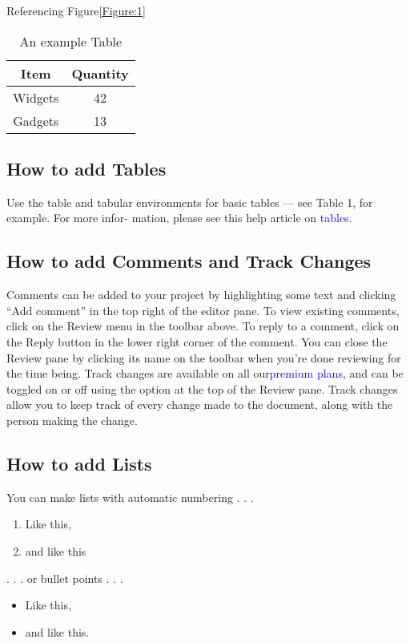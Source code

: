 \documentclass{article}
\begin{document}
Referencing Figure\ref{Figure:1}

\begin{table}[h]
	\centering
	\begin{tabular}{|c|c|}
		\hline
		\textbf{Item} & \textbf{Quantity}\\
		\hline
		Widgets & 42\\
		\hline
		Gadgets & 13\\
	\end{tabular}
\caption{An example Table}
\label{tab:example}
\end{table}



\subsection{How to add Tables}
Use the table and tabular environments for basic tables — see Table 1, for example. For more infor-
mation, please see this help article on \textcolor{blue}{tables}.

\subsection{How to add Comments and Track Changes}
Comments can be added to your project by highlighting some text and clicking “Add comment” in
the top right of the editor pane. To view existing comments, click on the Review menu in the toolbar
above. To reply to a comment, click on the Reply button in the lower right corner of the comment.
You can close the Review pane by clicking its name on the toolbar when you’re done reviewing for the
time being.
Track changes are available on all our\textcolor{blue}{premium plans}, and can be toggled on or off using the option
at the top of the Review pane. Track changes allow you to keep track of every change made to the
document, along with the person making the change.
\subsection{How to add Lists}
You can make lists with automatic numbering . . .
\begin{enumerate}
	\item Like this,
	\item and like this
\end{enumerate}
. . . or bullet points . . .
\begin{itemize}
		\item Like this,
		\item and like this.
\end{itemize}
\end{document}
